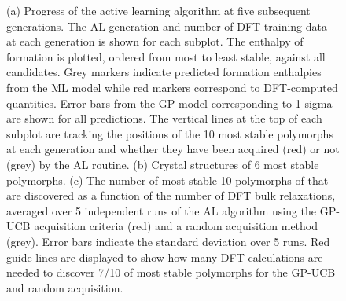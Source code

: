 \begin{figure}[!htb]
\centering
{}
\caption{\label{fig:iro2_al}
(a) Progress of the active learning algorithm at five subsequent generations.
%
The AL generation and number of DFT training data at each generation is shown for each subplot.
%
The enthalpy of formation is plotted, ordered from most to least stable, against all \IrOthree candidates.
%
Grey markers indicate predicted formation enthalpies from the ML model while red markers correspond to DFT-computed quantities.
%
Error bars from the GP model corresponding to 1 sigma are shown for all predictions.
%
The vertical lines at the top of each subplot are tracking the positions of the \num{10} most stable polymorphs at each generation and whether they have been acquired (red) or not (grey) by the AL routine.
(b) Crystal structures of \num{6} most stable \IrOthree polymorphs.
(c) The number of most stable \num{10} polymorphs of \IrOthree that are discovered as a function of the number of DFT bulk relaxations, averaged over \num{5} independent runs of the AL algorithm using the GP-UCB acquisition criteria (red) and a random acquisition method (grey).
%
Error bars indicate the standard deviation over \num{5} runs.
%
Red guide lines are displayed to show how many DFT calculations are needed to discover \num{7/10} of most stable polymorphs for the GP-UCB and random acquisition.
}
\end{figure}



